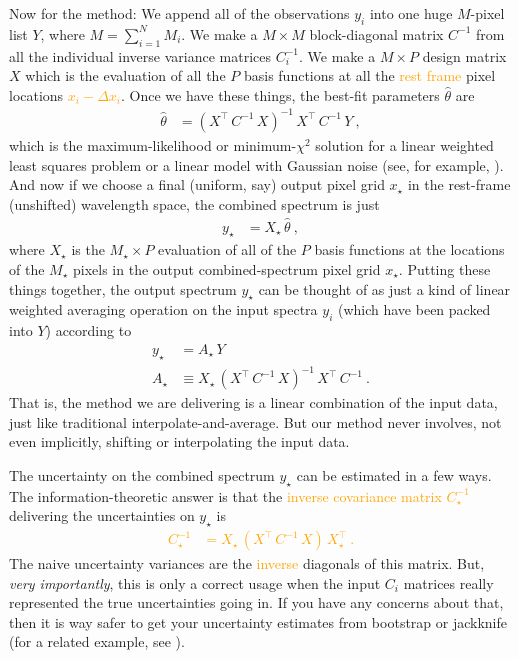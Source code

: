\documentclass[modern, linenumbers]{aastex631}
\newcommand{\modified}[1]{\textcolor{orange}{#1}}
\begin{document}
Now for the method:
We append all of the observations $y_i$ into one huge $M$-pixel list $Y$, where $M=\sum_{i=1}^N M_i$.
We make a $M\times M$ block-diagonal matrix $C^{-1}$ from all the individual inverse variance matrices $C_i^{-1}$.
We make a $M\times P$ design matrix $X$ which is the evaluation of all the $P$ basis functions at all the \modified{rest frame} pixel locations \modified{$x_i - \Delta{}x_i$}.
Once we have these things, the best-fit parameters $\hat\theta$ are
\begin{align}
    \hat\theta &= (X^\top\,C^{-1}\,X)^{-1}\,X^\top\,C^{-1}\,Y ~, \label{eq:xtxinvxty}
\end{align}
which is the maximum-likelihood or minimum-$\chi^2$ solution for a linear weighted least squares problem or a linear model with Gaussian noise (see, for example, \citealt{fitting}).
And now if we choose a final (uniform, say) output pixel grid $x_\star$ in the rest-frame (unshifted) wavelength space, the combined spectrum is just
\begin{align}
    y_\star &= X_\star\,\hat\theta ~,
\end{align}
where $X_\star$ is the $M_\star\times P$ evaluation of all of the $P$ basis functions at the locations of the $M_\star$ pixels in the output combined-spectrum pixel grid $x_\star$.
Putting these things together, the output spectrum $y_\star$ can be thought of as just a kind of linear weighted averaging operation on the input spectra $y_i$ (which have been packed into $Y$) according to
\begin{align}
    y_\star &= A_\star\,Y \\
    A_\star &\equiv X_\star\,(X^\top\,C^{-1}\,X)^{-1}\,X^\top\,C^{-1} ~.
\end{align}
That is, the method we are delivering is a linear combination of the input data, just like traditional interpolate-and-average.
But our method never involves, not even implicitly, shifting or interpolating the input data.

The uncertainty on the combined spectrum $y_\star$ can be estimated in a few ways.
The information-theoretic answer is that the \modified{inverse covariance matrix $C_\star^{-1}$} delivering the uncertainties on $y_\star$ is
\modified{
\begin{align}
    C_\star^{-1} &= X_\star\,(X^\top\,C^{-1}\,X)\,X_\star^\top ~.\label{eq:outcovar}
\end{align}
}The naive uncertainty variances are the \modified{inverse} diagonals of this matrix.
But, \emph{very importantly}, this is only a correct usage when the input $C_i$ matrices really represented the true uncertainties going in.
If you have any concerns about that, then it is way safer to get your uncertainty estimates from bootstrap or jackknife (for a related example, see \citealt{fittingflexible}).
\end{document}
